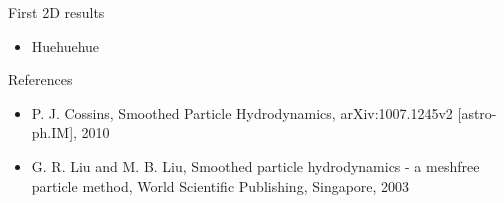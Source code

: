 \documentclass{beamer}
\begin{document}
\begin{frame}{First 2D results}
\begin{itemize}

\item Huehuehue

\end{itemize}
\end{frame}

\begin{frame}{References}
\begin{itemize}

\item P. J. Cossins, Smoothed Particle Hydrodynamics, arXiv:1007.1245v2 [astro-ph.IM], 2010 

\item G. R. Liu and M. B. Liu, Smoothed particle hydrodynamics - a meshfree particle method, World Scientific Publishing, Singapore, 2003

\end{itemize}
\end{frame}
\end{document}
